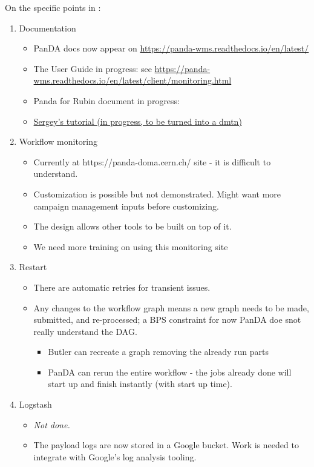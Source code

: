 On the specific points in :
\begin{enumerate}
\item Documentation
\begin{itemize}
\item PanDA docs now appear on \url{https://panda-wms.readthedocs.io/en/latest/}
\item The User Guide in progress:  see \url{https://panda-wms.readthedocs.io/en/latest/client/monitoring.html}
\item Panda for Rubin document in progress: 
\item \href{https://docs.google.com/document/d/1J0Dxe_TJoIpWQm_izBY4Cz6mWkgLCVTZB6pZxkjS0Gg/edit}{ Sergey’s tutorial (in progress, to be turned into a dmtn) }
\end{itemize}
\item Workflow monitoring
\begin{itemize}
\item Currently at https://panda-doma.cern.ch/ site - it is difficult to understand.
\item Customization is possible but not demonstrated. Might want more campaign management inputs before customizing.
\item The design allows other tools to be built on top of it.
\item We need more training on using this monitoring site
\end{itemize}
\item Restart
\begin{itemize}
\item  There are automatic retries for transient issues.
\item Any changes to the workflow graph means a new graph needs to be made, submitted, and re-processed;  a BPS constraint for now PanDA doe snot really understand the DAG.
\begin{itemize}
\item Butler can recreate a graph removing the already run parts
\item PanDA can rerun the entire workflow - the jobs already done will start up and finish instantly (with start up time).
\end{itemize}

\end{itemize}
\item Logstash
\begin{itemize}
\item \emph{ Not done. }
\item The payload logs are now stored in a Google bucket. Work is needed to integrate with Google's log analysis tooling.


\end{itemize}
\end{enumerate}
